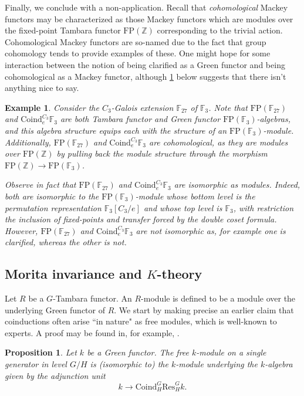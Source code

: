 \documentclass[11pt,dvipsnames]{amsart}
\newcommand{\Z}{\mathbb{Z}}
\newcommand{\F}{\mathbb{F}}
\newtheorem{proposition}[theorem]{Proposition}
\theoremstyle{BoldRemark}
\newtheorem{example}[theorem]{Example}
\begin{document}
Finally, we conclude with a non-application. Recall that \emph{cohomological} Mackey functors may be characterized as those Mackey functors which are modules over the fixed-point Tambara functor $\mathrm{FP}(\Z)$ corresponding to the trivial action. Cohomological Mackey functors are so-named due to the fact that group cohomology tends to provide examples of these. One might hope for some interaction between the notion of being clarified as a Green functor and being cohomological as a Mackey functor, although \cref{ex:clarified-and-cohomological} below suggests that there isn't anything nice to say.

\begin{example}\label{ex:clarified-and-cohomological}
	Consider the $C_3$-Galois extension $\F_{27}$ of $\F_3$. Note that $\mathrm{FP}(\F_{27})$ and $\mathrm{Coind}_e^{C_3} \F_3$ are both Tambara functor and Green functor $\mathrm{FP}(\F_3)$-algebras, and this algebra structure equips each with the structure of an $\mathrm{FP}(\F_3)$-module. Additionally, $\mathrm{FP}(\F_{27})$ and $\mathrm{Coind}_e^{C_3} \F_3$ are cohomological, as they are modules over $\mathrm{FP}(\Z)$ by pulling back the module structure through the morphism $\mathrm{FP}(\Z) \rightarrow \mathrm{FP}(\F_3)$.
	
	Observe in fact that $\mathrm{FP}(\F_{27})$ and $\mathrm{Coind}_e^{C_3} \F_3$ are isomorphic \emph{as modules}. Indeed, both are isomorphic to the $\mathrm{FP}(\F_3)$-module whose bottom level is the permutation representation $\F_3[C_3/e]$ and whose top level is $\F_3$, with restriction the inclusion of fixed-points and transfer forced by the double coset formula. However, $\mathrm{FP}(\F_{27})$ and $\mathrm{Coind}_e^{C_3} \F_3$ are not isomorphic as, for example one is clarified, whereas the other is not.
\end{example}


\subsection{\texorpdfstring{Morita invariance and $K$-theory}{Morita invariance and K-theory}}

Let $R$ be a $G$-Tambara functor. An $R$-module is defined to be a module over the underlying Green functor of $R$. We start by making precise an earlier claim that coinductions often arise ``in nature" as free modules, which is well-known to experts. A proof may be found in, for example, \cite{CW25}.

\begin{proposition}\label{prop:free-k-modules-are-coinduced}
	Let $k$ be a Green functor. The free $k$-module on a single generator in level $G/H$ is (isomorphic to) the $k$-module underlying the $k$-algebra given by the adjunction unit
	\[
		k \rightarrow \mathrm{Coind}_H^G \mathrm{Res}_H^G k .
	\]
\end{proposition}
\end{document}

